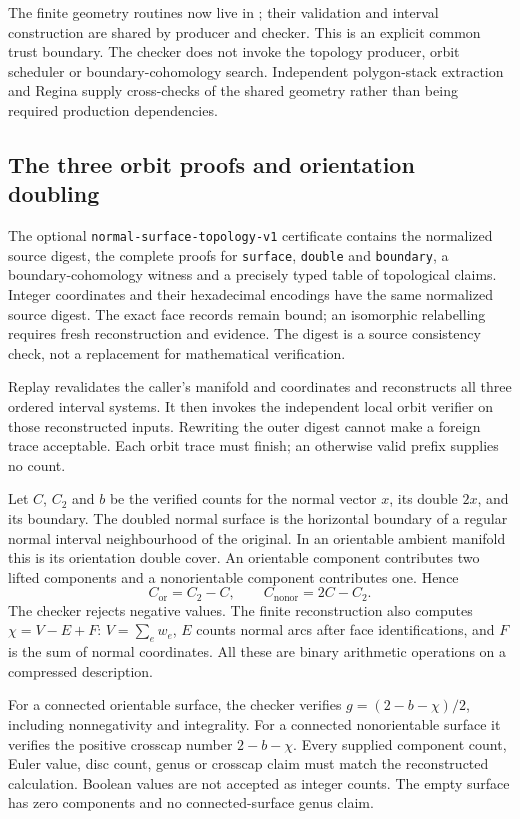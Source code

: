 The finite geometry routines now live in
; their validation and
interval construction are shared by producer and checker. This is an
explicit common trust boundary. The checker does not invoke the topology
producer, orbit scheduler or boundary-cohomology search. Independent
polygon-stack extraction and Regina supply cross-checks of the shared
geometry rather than being required production dependencies.

\subsection{The three orbit proofs and orientation doubling}

The optional \texttt{normal-surface-topology-v1} certificate contains the
normalized source digest, the complete proofs for \texttt{surface},
\texttt{double} and \texttt{boundary}, a boundary-cohomology witness and a
precisely typed table of topological claims. Integer coordinates and their
hexadecimal encodings have the same normalized source digest. The exact
face records remain bound; an isomorphic relabelling requires fresh
reconstruction and evidence. The digest is a source consistency check, not
a replacement for mathematical verification.

Replay revalidates the caller's manifold and coordinates and reconstructs
all three ordered interval systems. It then invokes the independent local
orbit verifier on those reconstructed inputs. Rewriting the outer digest
cannot make a foreign trace acceptable. Each orbit trace must finish;
an otherwise valid prefix supplies no count.

Let $C$, $C_2$ and $b$ be the verified counts for the normal vector $x$,
its double $2x$, and its boundary. The doubled normal surface is the
horizontal boundary of a regular normal interval neighbourhood of the
original. In an orientable ambient manifold this is its orientation double
cover. An orientable component contributes two lifted components and a
nonorientable component contributes one. Hence
\[
 C_{\mathrm{or}}=C_2-C,\qquad C_{\mathrm{nonor}}=2C-C_2.
\]
The checker rejects negative values. The finite reconstruction also computes
$\chi=V-E+F$: $V=\sum_e w_e$, $E$ counts normal arcs after face
identifications, and $F$ is the sum of normal coordinates. All these are
binary arithmetic operations on a compressed description.

For a connected orientable surface, the checker verifies
$g=(2-b-\chi)/2$, including nonnegativity and integrality. For a connected
nonorientable surface it verifies the positive crosscap number
$2-b-\chi$. Every supplied component count, Euler value, disc count,
genus or crosscap claim must match the reconstructed calculation. Boolean
values are not accepted as integer counts. The empty surface has zero
components and no connected-surface genus claim.

